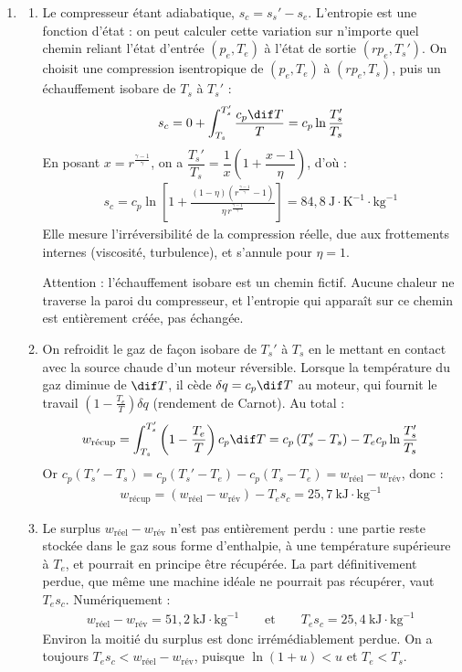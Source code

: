 \begin{correction}
\begin{enumerate}
	\item
	\begin{enumerate}
		\item Le compresseur étant adiabatique, $s_c=s_s'-s_e$. L'entropie est une fonction d'état : on peut calculer cette variation sur n'importe quel chemin reliant l'état d'entrée $(p_e,T_e)$ à l'état de sortie $(rp_e,T_s')$. On choisit une compression isentropique de $(p_e,T_e)$ à $(rp_e,T_s)$, puis un échauffement isobare de $T_s$ à $T_s'$ :
		\begin{align*}
			s_c=0+\int_{T_s}^{T_s'}\frac{c_p\dif T}{T}=c_p\ln\frac{T_s'}{T_s}
		\end{align*}
		En posant $x=r^{\frac{\gamma-1}{\gamma}}$, on a $\dfrac{T_s'}{T_s}=\dfrac{1}{x}\left(1+\dfrac{x-1}{\eta}\right)$, d'où :
		\begin{align*}
			\boxed{s_c=c_p\ln\left[1+\frac{(1-\eta)\left(r^{\frac{\gamma-1}{\gamma}}-1\right)}{\eta\,r^{\frac{\gamma-1}{\gamma}}}\right]}=84{,}8~\text{J}\cdot\text{K}^{-1}\cdot\text{kg}^{-1}
		\end{align*}
		Elle mesure l'irréversibilité de la compression réelle, due aux frottements internes (viscosité, turbulence), et s'annule pour $\eta=1$.

		Attention : l'échauffement isobare est un chemin fictif. Aucune chaleur ne traverse la paroi du compresseur, et l'entropie qui apparaît sur ce chemin est entièrement créée, pas échangée.

		\item On refroidit le gaz de façon isobare de $T_s'$ à $T_s$ en le mettant en contact avec la source chaude d'un moteur réversible. Lorsque la température du gaz diminue de $\dif T$, il cède $\delta q=c_p\dif T$ au moteur, qui fournit le travail $\left(1-\frac{T_e}{T}\right)\delta q$ (rendement de Carnot). Au total :
		\begin{align*}
			w_{\text{récup}}=\int_{T_s}^{T_s'}\left(1-\frac{T_e}{T}\right)c_p\dif T=c_p\left(T_s'-T_s\right)-T_ec_p\ln\frac{T_s'}{T_s}
		\end{align*}
		Or $c_p(T_s'-T_s)=c_p(T_s'-T_e)-c_p(T_s-T_e)=w_{\text{réel}}-w_{\text{rév}}$, donc :
		\begin{align*}
			\boxed{w_{\text{récup}}=\left(w_{\text{réel}}-w_{\text{rév}}\right)-T_es_c}=25{,}7~\text{kJ}\cdot\text{kg}^{-1}
		\end{align*}

		\item Le surplus $w_{\text{réel}}-w_{\text{rév}}$ n'est pas entièrement perdu : une partie reste stockée dans le gaz sous forme d'enthalpie, à une température supérieure à $T_e$, et pourrait en principe être récupérée. La part définitivement perdue, que même une machine idéale ne pourrait pas récupérer, vaut $T_es_c$. Numériquement :
		\begin{align*}
			w_{\text{réel}}-w_{\text{rév}}=51{,}2~\text{kJ}\cdot\text{kg}^{-1} \qquad\text{et}\qquad T_es_c=25{,}4~\text{kJ}\cdot\text{kg}^{-1}
		\end{align*}
		Environ la moitié du surplus est donc irrémédiablement perdue. On a toujours $T_es_c<w_{\text{réel}}-w_{\text{rév}}$, puisque $\ln(1+u)<u$ et $T_e<T_s$.


\end{enumerate}
\end{enumerate}
\end{correction}

